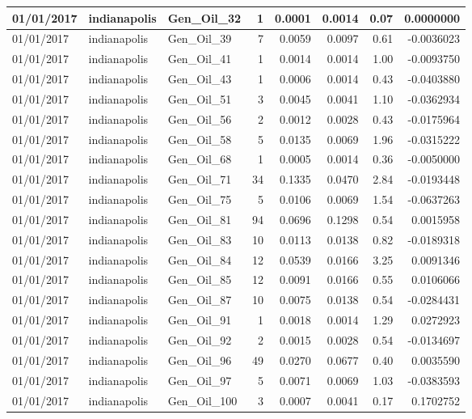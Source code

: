 \documentclass[
  letterpaper,
  DIV=11,
  numbers=noendperiod]{scrartcl}
\begin{document}
\begin{tabular}{l|l|l|r|r|r|r|r}
\hline
01/01/2017 & indianapolis & Gen\_Oil\_32 & 1 & 0.0001 & 0.0014 & 0.07 & 0.0000000\\
\hline
01/01/2017 & indianapolis & Gen\_Oil\_39 & 7 & 0.0059 & 0.0097 & 0.61 & -0.0036023\\
\hline
01/01/2017 & indianapolis & Gen\_Oil\_41 & 1 & 0.0014 & 0.0014 & 1.00 & -0.0093750\\
\hline
01/01/2017 & indianapolis & Gen\_Oil\_43 & 1 & 0.0006 & 0.0014 & 0.43 & -0.0403880\\
\hline
01/01/2017 & indianapolis & Gen\_Oil\_51 & 3 & 0.0045 & 0.0041 & 1.10 & -0.0362934\\
\hline
01/01/2017 & indianapolis & Gen\_Oil\_56 & 2 & 0.0012 & 0.0028 & 0.43 & -0.0175964\\
\hline
01/01/2017 & indianapolis & Gen\_Oil\_58 & 5 & 0.0135 & 0.0069 & 1.96 & -0.0315222\\
\hline
01/01/2017 & indianapolis & Gen\_Oil\_68 & 1 & 0.0005 & 0.0014 & 0.36 & -0.0050000\\
\hline
01/01/2017 & indianapolis & Gen\_Oil\_71 & 34 & 0.1335 & 0.0470 & 2.84 & -0.0193448\\
\hline
01/01/2017 & indianapolis & Gen\_Oil\_75 & 5 & 0.0106 & 0.0069 & 1.54 & -0.0637263\\
\hline
01/01/2017 & indianapolis & Gen\_Oil\_81 & 94 & 0.0696 & 0.1298 & 0.54 & 0.0015958\\
\hline
01/01/2017 & indianapolis & Gen\_Oil\_83 & 10 & 0.0113 & 0.0138 & 0.82 & -0.0189318\\
\hline
01/01/2017 & indianapolis & Gen\_Oil\_84 & 12 & 0.0539 & 0.0166 & 3.25 & 0.0091346\\
\hline
01/01/2017 & indianapolis & Gen\_Oil\_85 & 12 & 0.0091 & 0.0166 & 0.55 & 0.0106066\\
\hline
01/01/2017 & indianapolis & Gen\_Oil\_87 & 10 & 0.0075 & 0.0138 & 0.54 & -0.0284431\\
\hline
01/01/2017 & indianapolis & Gen\_Oil\_91 & 1 & 0.0018 & 0.0014 & 1.29 & 0.0272923\\
\hline
01/01/2017 & indianapolis & Gen\_Oil\_92 & 2 & 0.0015 & 0.0028 & 0.54 & -0.0134697\\
\hline
01/01/2017 & indianapolis & Gen\_Oil\_96 & 49 & 0.0270 & 0.0677 & 0.40 & 0.0035590\\
\hline
01/01/2017 & indianapolis & Gen\_Oil\_97 & 5 & 0.0071 & 0.0069 & 1.03 & -0.0383593\\
\hline
01/01/2017 & indianapolis & Gen\_Oil\_100 & 3 & 0.0007 & 0.0041 & 0.17 & 0.1702752\\

\end{tabular}
\end{document}
